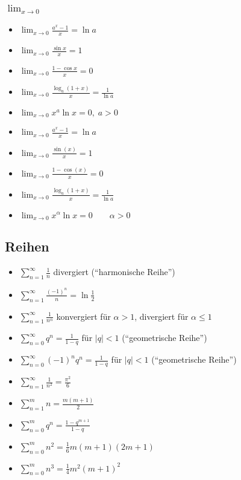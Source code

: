 \subsubsection{$\lim_{x \to 0}$}
\begin{itemize}[leftmargin=*]
	\item $\lim_{x \to 0} \frac{a^x - 1}{x} = \ln a$
	\item $\lim_{x \to 0} \frac{\sin x}{x} = 1$
	\item $\lim_{x \to 0} \frac{1 - \cos x}{x} = 0$
	\item $\lim_{x \to 0} \frac{\log_a (1 + x)}{x} = \frac{1}{\ln a}$
	\item $\lim_{x \to 0} x^a \ln x = 0, \; a  > 0$
	\item $\lim_{x \to 0} \frac{a^x-1}{x} = \ln a$ 
	\item $\lim_{x \to 0} \frac{\sin(x)}{x} = 1$ 
	\item $\lim_{x \to 0} \frac{1-\cos(x)}{x} = 0 \quad$ 
	\item $\lim_{x \to 0} \frac{\log_a(1+x)}{x} = \frac{1}{\ln a}$
	\item $\lim_{x \to 0} x^\alpha \ln x = 0 \qquad \alpha > 0$
\end{itemize}

\subsection{Reihen}
\begin{itemize}[leftmargin=*]
	\item $\sum_{n=1}^\infty \frac{1}{n}$ divergiert (``harmonische Reihe'')
	\item $\sum_{n=1}^\infty \frac{(-1)^n}{n} = \ln \frac{1}{2}$
	\item $\sum_{n=1}^\infty \frac{1}{n^\alpha}$ konvergiert für $\alpha > 1$,
	divergiert für $\alpha \leq 1$
	\item $\sum_{n=0}^\infty q^n = \frac{1}{1-q}$ für $|q| < 1$ (``geometrische
	Reihe'')
	\item $\sum_{n=0}^\infty (-1)^n q^n = \frac{1}{1-q}$ für $|q| < 1$ (``geometrische
	Reihe'')
	\item $\sum_{n=1}^\infty \frac{1}{n^2} = \frac{\pi^2}{6}$
	\newline
	\item $\sum_{n=1}^m n = \frac{m(m+1)}{2}$
	\item $\sum_{n=0}^m q^n = \frac{1-q^{m+1}}{1-q}$ 
	\item  $\sum_{n=0}^m n^2 = \frac{1}{6}m(m+1)(2m+1)$
	\item  $\sum_{n=0}^m n^3 = \frac{1}{4}m^2(m+1)^2$
\end{itemize}

